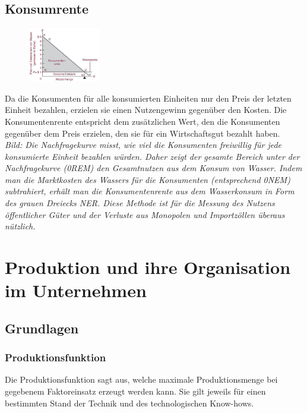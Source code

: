 \documentclass[10pt]{scrartcl}
\begin{document}
\subsection{Konsumrente}
\begin{figure}
\vspace{-20pt}
  \begin{center}
    \includegraphics[width=0.28\textwidth]{img/konsumrente.jpg}
  \end{center}
  \vspace{-20pt}
\end{figure}
Da die Konsumenten für alle konsumierten Einheiten nur den Preis der letzten Einheit bezahlen, erzielen sie einen Nutzengewinn gegenüber den Kosten. Die Konsumentenrente entspricht dem zusätzlichen Wert, den die Konsumenten gegenüber dem Preis erzielen, den sie für ein Wirtschaftsgut bezahlt haben.\\
{\it Bild: Die Nachfragekurve misst, wie viel die Konsumenten freiwillig für jede konsumierte Einheit bezahlen würden. Daher zeigt der gesamte Bereich unter der Nachfragekurve (0REM) den Gesamtnutzen aus dem Konsum von Wasser. Indem man die Marktkosten des Wassers für die Konsumenten (entsprechend 0NEM) subtrahiert, erhält man die Konsumentenrente aus dem Wasserkonsum in Form des grauen Dreiecks NER. Diese Methode ist für die Messung des Nutzens öffentlicher Güter und der Verluste aus Monopolen und Importzöllen überaus nützlich.}


\section{Produktion und ihre Organisation im Unternehmen}
\subsection{Grundlagen}
\subsubsection{Produktionsfunktion}
Die Produktionsfunktion sagt aus, welche maximale Produktionsmenge bei gegebenem Faktoreinsatz erzeugt werden kann. Sie gilt jeweils für einen bestimmten Stand der Technik und des technologischen Know-hows. 
\end{document}
